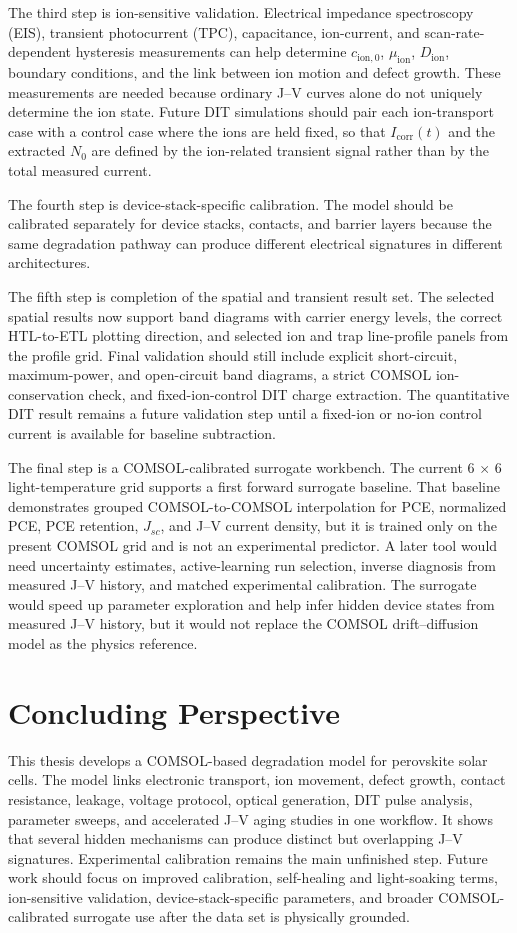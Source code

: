 The third step is ion-sensitive validation. Electrical impedance spectroscopy
(EIS), transient photocurrent (TPC), capacitance, ion-current, and
scan-rate-dependent hysteresis measurements can help determine
$c_{\mathrm{ion},0}$, $\mu_{\mathrm{ion}}$, $D_{\mathrm{ion}}$, boundary
conditions, and the link between ion motion and defect growth. These
measurements are needed because ordinary J--V curves alone do not uniquely
determine the ion state.
Future DIT simulations should pair each ion-transport case with a control case
where the ions are held fixed, so that $I_{\mathrm{corr}}(t)$ and the extracted
$N_0$ are defined by the ion-related transient signal rather than by the total
measured current.

The fourth step is device-stack-specific calibration. The model should be
calibrated separately for device stacks, contacts, and barrier layers because
the same degradation pathway can produce different electrical signatures in
different architectures.

The fifth step is completion of the spatial and transient result set. The
selected spatial results now support band diagrams with carrier energy levels,
the correct HTL-to-ETL plotting direction, and selected ion and trap
line-profile panels from the profile grid. Final validation should still
include explicit short-circuit, maximum-power, and open-circuit band diagrams,
a strict COMSOL ion-conservation check, and fixed-ion-control DIT charge
extraction. The quantitative DIT result remains a future validation step until
a fixed-ion or no-ion control current is available for baseline subtraction.

The final step is a COMSOL-calibrated surrogate workbench. The current
6 $\times$ 6 light-temperature grid supports a first forward surrogate
baseline. That baseline demonstrates grouped COMSOL-to-COMSOL interpolation
for PCE, normalized PCE, PCE retention, $J_{sc}$, and J--V current density, but
it is trained only on the present COMSOL grid and is not an experimental
predictor. A later tool would need uncertainty estimates, active-learning run
selection, inverse diagnosis from measured J--V history, and matched
experimental calibration. The surrogate would speed up parameter exploration
and help infer hidden device states from measured J--V history, but it would
not replace the COMSOL drift--diffusion model as the physics reference.

\section{Concluding Perspective}

This thesis develops a COMSOL-based degradation model for perovskite solar
cells. The model links electronic transport, ion movement, defect growth,
contact resistance, leakage, voltage protocol, optical generation, DIT pulse
analysis, parameter sweeps, and accelerated J--V aging studies in one workflow.
It shows that several hidden mechanisms can produce distinct but overlapping
J--V signatures. Experimental calibration remains the main unfinished step.
Future work should focus on improved calibration, self-healing and
light-soaking terms, ion-sensitive validation, device-stack-specific
parameters, and broader COMSOL-calibrated surrogate use after the data set is
physically grounded.
